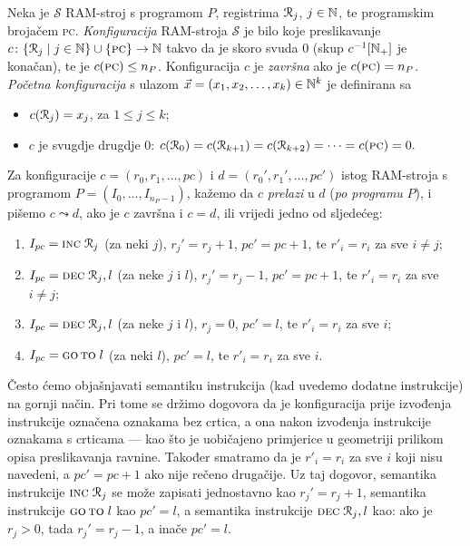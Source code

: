 \begin{definicija}\label{def:RAMconf}
Neka je $\mathcal S$ RAM-stroj s programom $P$, registrima $\mathcal R_{j}$, $j\in{\mathbb N}$, te programskim brojačem \textsc{pc}. \emph{Konfiguracija} RAM-stroja $\mathcal S$ je bilo koje preslikavanje $c\colon\{\mathcal R_{j}\mid j\in{\mathbb N}\}\cup\{\textsc{pc}\}\to{\mathbb N}$ takvo da je skoro svuda $0$ (skup $c^{-1}[{\mathbb N}_+]$ je konačan), te je $c(\textsc{pc})\le n_P$. Konfiguracija $c$ je \emph{završna} ako je $c(\textsc{pc})=n_P$. \emph{Početna konfiguracija} s ulazom $\vec x=(x_1,x_2,\dotsc,x_k)\in{\mathbb N}^k$ je definirana sa
\begin{itemize}
    \item $c(\mathcal R_{j})=x_j$, za $1\le j\le k$;
    \item $c$ je svugdje drugdje $0$: $c(\mathcal R_{0})=c(\mathcal R_{k+1})=c(\mathcal R_{k+2})=\dotsb=c(\textsc{pc})=0.$
\end{itemize}

Za konfiguracije $c=(r_0,r_1,\dotsc,pc)$ i $d=(r_0',r_1',\dotsc,pc')$ istog RAM-stroja s programom $P=(I_0,\dotsc,I_{n_P-1})$, kažemo da $c$ \emph{prelazi} u $d$ (\emph{po programu} $P$), i pišemo $c\leadsto d$, ako je $c$ završna i $c=d$, ili vrijedi jedno od sljedećeg:
\begin{enumerate}
    \item\label{stav:leadINC} $I_{pc}=\textsc{inc}\;\mathcal R_{j}$ (za neki $j$), $r_j'=r_j+1$, $pc'=pc+1$, te $r'_i=r_i$ za sve $i\not=j$;
    \item\label{stav:leadDEC-} $I_{pc}=\textsc{dec}\;\mathcal R_{j},l$ (za neke $j$ i $l$),  $r_j'=r_j-1$, $pc'=pc+1$, te $r'_i=r_i$ za sve $i\not=j$;
    \item\label{stav:leadDEC0} $I_{pc}=\textsc{dec}\;\mathcal R_{j},l$ (za neke $j$ i $l$), $r_j=0$, $pc'=l$, te $r'_i=r_i$ za sve $i$;
    \item\label{stav:leadGOTO} $I_{pc}=\textsc{go\,to}\;l$ (za neki $l$), $pc'=l$, te $r'_i=r_i$ za sve $i$.\qedhere
\end{enumerate}
\end{definicija}

Često ćemo objašnjavati semantiku instrukcija (kad uvedemo dodatne instrukcije) na gornji način. Pri tome se držimo dogovora da je konfiguracija prije izvođenja instrukcije označena oznakama bez crtica, a ona nakon izvođenja instrukcije oznakama s crticama --- kao što je uobičajeno primjerice u geometriji prilikom opisa preslikavanja ravnine. Također smatramo da je $r'_i=r_i$ za sve $i$ koji nisu navedeni, a $pc'=pc+1$ ako nije rečeno drugačije. Uz taj dogovor, semantika instrukcije $\textsc{inc}\;\mathcal R_{j}$ se može zapisati jednostavno kao $r_j'=r_j+1$, semantika instrukcije $\textsc{go\,to}\;l$ kao $pc'=l$, a semantika instrukcije $\textsc{dec}\;\mathcal R_{j},l$ kao: ako je $r_j>0$, tada $r_j'=r_j-1$, a inače $pc'=l$.

